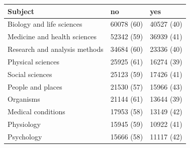 \begin{table}[ht]
\centering
\begin{tabular}{lll}
 Subject & no & yes \\ 
  \hline
Biology and life sciences & 60078 (60) & 40527 (40) \\ 
  Medicine and health sciences & 52342 (59) & 36939 (41) \\ 
  Research and analysis methods & 34684 (60) & 23336 (40) \\ 
  Physical sciences & 25925 (61) & 16274 (39) \\ 
  Social sciences & 25123 (59) & 17426 (41) \\ 
  People and places & 21530 (57) & 15966 (43) \\ 
  Organisms & 21144 (61) & 13644 (39) \\ 
  Medical conditions & 17953 (58) & 13149 (42) \\ 
  Physiology & 15945 (59) & 10922 (41) \\ 
  Psychology & 15666 (58) & 11117 (42) \\ 
  \end{tabular}
\end{table}
